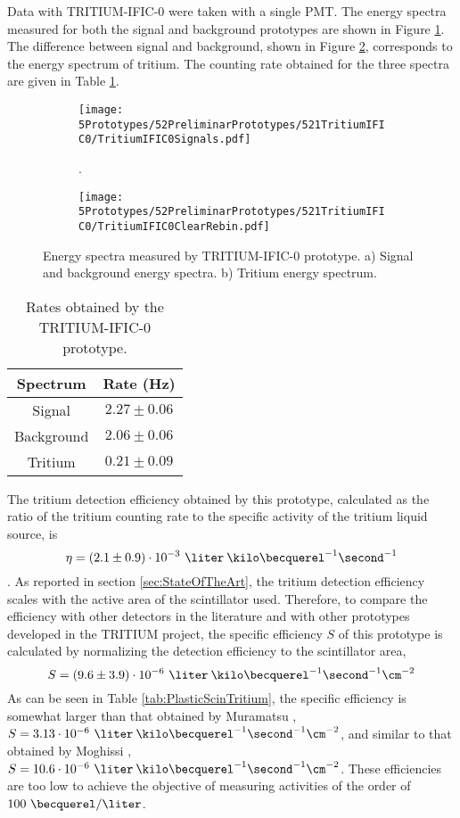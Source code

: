 Data with TRITIUM-IFIC-0 were taken with a single PMT. The energy spectra measured for both the signal and background prototypes are shown in Figure \ref{subfig:SignalBackgroundEnergySpectraTritiumIFIC0}. The difference between signal and background, shown in Figure \ref{subfig:TritiumEnergySpectraTritiumIFIC0}, corresponds to the energy spectrum of tritium. The counting rate obtained for the three spectra are given in Table \ref{tab:CountsPerSecondTRITIUMIFIC0}.
\begin{figure}
\centering
    \begin{subfigure}[b]{1\textwidth}
    \centering
    \texttt{[image: 5Prototypes/52PreliminarPrototypes/521TritiumIFIC0/TritiumIFIC0Signals.pdf]}  
    \caption{.\label{subfig:SignalBackgroundEnergySpectraTritiumIFIC0}}
    \end{subfigure}
    \hfill
    \begin{subfigure}[b]{1\textwidth}
    \centering
    \texttt{[image: 5Prototypes/52PreliminarPrototypes/521TritiumIFIC0/TritiumIFIC0ClearRebin.pdf]}  
    \caption{\label{subfig:TritiumEnergySpectraTritiumIFIC0}}
    \end{subfigure}
 \caption{Energy spectra measured by TRITIUM-IFIC-0 prototype. a) Signal and background energy spectra. b) Tritium energy spectrum.}
 \label{fig:EnergySpectraTRITIUMIFIC0}
\end{figure}
\begin{table}[htbp]
\centering{}%
\begin{tabular}{cc}
\toprule 
Spectrum & Rate (Hz) \tabularnewline
\midrule
\midrule 
Signal & $2.27 \pm 0.06$ \tabularnewline
Background & $2.06 \pm 0.06$ \tabularnewline  
Tritium & $0.21 \pm 0.09$ \tabularnewline
\bottomrule
\end{tabular}
\caption{Rates obtained by the TRITIUM-IFIC-0 prototype.}
\label{tab:CountsPerSecondTRITIUMIFIC0}
\end{table}
The tritium detection efficiency obtained by this prototype, calculated as the ratio of the tritium counting rate to the specific activity of the tritium liquid source, is $$\eta=(2.1 \pm 0.9)\cdot{} 10^{-3}~\liter\:\kilo\becquerel^{-1}\second^{-1}$$. As reported in section \ref{sec:StateOfTheArt}, the tritium detection efficiency scales with the active area of the scintillator used. Therefore, to compare the efficiency with other detectors in the literature and with other prototypes developed in the TRITIUM project, the specific efficiency $S$ of this prototype is calculated by normalizing the detection efficiency to the scintillator area,
$$S = (9.6 \pm 3.9)\cdot{} 10^{-6}~\liter\:\kilo\becquerel^{-1}\second^{-1}\cm^{-2}$$
As can be seen in Table \ref{tab:PlasticScinTritium}, the specific efficiency is somewhat larger than that obtained by Muramatsu \cite{Muramatsu}, $S=3.13 \cdot{} 10^{-6}~\liter\:\kilo\becquerel^{-1}\second^{-1}\cm^{-2}$, and similar to that obtained by Moghissi \cite{Moghissi}, $S=10.6 \cdot{} 10^{-6}~\liter\:\kilo\becquerel^{-1}\second^{-1}\cm^{-2}$. These efficiencies are too low to achieve the objective of measuring activities of the order of $100~\becquerel/\liter$. 

